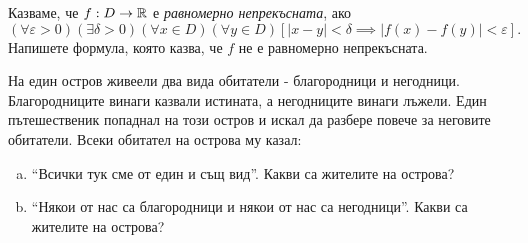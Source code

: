 \begin{problem}
  Казваме, че $f:D \to \mathbb{R}$ е {\em равномерно непрекъсната}, ако 
  \[(\forall \varepsilon > 0)(\exists \delta > 0)(\forall x\in D)(\forall y \in D)[|x-y| < \delta \implies |f(x) - f(y)| < \varepsilon].\]
  Напишете формула, която казва, че $f$ не е равномерно непрекъсната.
\end{problem}



\begin{problem}
  На един остров живеели два вида обитатели - благородници и негодници.
  Благородниците винаги казвали истината, а негодниците винаги лъжели.
  Един пътешественик попаднал на този остров и искал да разбере повече за
  неговите обитатели. 
  Всеки обитател на острова му казал:
  \begin{enumerate}[a)]
  \item
    ``Всички тук сме от един и същ вид''.
    Какви са жителите на острова?
  \item
    ``Някои от  нас са благородници и някои от нас са негодници''.
    Какви са жителите на острова?
  \end{enumerate}
\end{problem}
